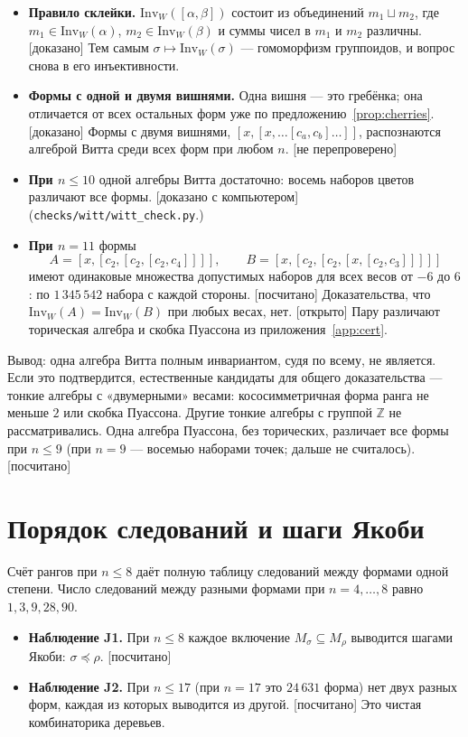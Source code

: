 \documentclass[11pt]{article}
\newcommand{\Inv}{\mathrm{Inv}}
\newcommand{\Z}{\mathbb Z}
\newcommand{\stat}[1]{\textsf{\small[#1]}}
\newcommand{\proved}{\stat{доказано}}
\newcommand{\comproved}{\stat{доказано с компьютером}}
\newcommand{\computed}{\stat{посчитано}}
\newcommand{\unchecked}{\stat{не перепроверено}}
\newcommand{\open}{\stat{открыто}}
\theoremstyle{plain}
\theoremstyle{definition}
\theoremstyle{remark}
\begin{document}
\begin{itemize}
\item \textbf{Правило склейки.} $\Inv_W([\alpha,\beta])$ состоит из объединений $m_1\sqcup m_2$, где $m_1\in\Inv_W(\alpha)$, $m_2\in\Inv_W(\beta)$ и суммы чисел в $m_1$ и $m_2$ различны. \proved{} Тем самым $\sigma\mapsto\Inv_W(\sigma)$ --- гомоморфизм группоидов, и вопрос снова в его инъективности.
\item \textbf{Формы с одной и двумя вишнями.} Одна вишня --- это гребёнка; она отличается от всех остальных форм уже по предложению~\ref{prop:cherries}. \proved{} Формы с двумя вишнями, $[x,[x,\dots[c_a,c_b]\dots]]$, распознаются алгеброй Витта среди всех форм при любом $n$. \unchecked
\item \textbf{При $n\le10$} одной алгебры Витта достаточно: восемь наборов цветов различают все формы. \comproved{} (\texttt{checks/witt/witt\_check.py}.)
\item \textbf{При $n=11$} формы
\[ A=[x,[c_2,[c_2,[c_2,c_4]]]],\qquad B=[x,[c_2,[c_2,[x,[c_2,c_3]]]]] \]
имеют одинаковые множества допустимых наборов для всех весов от $-6$ до $6$: по $1\,345\,542$ набора с каждой стороны. \computed{} Доказательства, что $\Inv_W(A)=\Inv_W(B)$ при любых весах, нет. \open{} Пару различают торическая алгебра и скобка Пуассона из приложения~\ref{app:cert}.
\end{itemize}

Вывод: одна алгебра Витта полным инвариантом, судя по всему, не является. Если это подтвердится, естественные кандидаты для общего доказательства --- тонкие алгебры с «двумерными» весами: кососимметричная форма ранга не меньше $2$ или скобка Пуассона. Другие тонкие алгебры с группой $\Z$ не рассматривались. Одна алгебра Пуассона, без торических, различает все формы при $n\le9$ (при $n=9$ --- восемью наборами точек; дальше не считалось). \computed

\section{Порядок следований и шаги Якоби}

Счёт рангов при $n\le8$ даёт полную таблицу следований между формами одной степени. Число следований между разными формами при $n=4,\dots,8$ равно $1,3,9,28,90$.

\begin{itemize}
\item \textbf{Наблюдение J1.} При $n\le8$ каждое включение $M_\sigma\subseteq M_\rho$ выводится шагами Якоби: $\sigma\preceq\rho$. \computed
\item \textbf{Наблюдение J2.} При $n\le17$ (при $n=17$ это $24\,631$ форма) нет двух разных форм, каждая из которых выводится из другой. \computed{} Это чистая комбинаторика деревьев.
\end{itemize}
\end{document}
